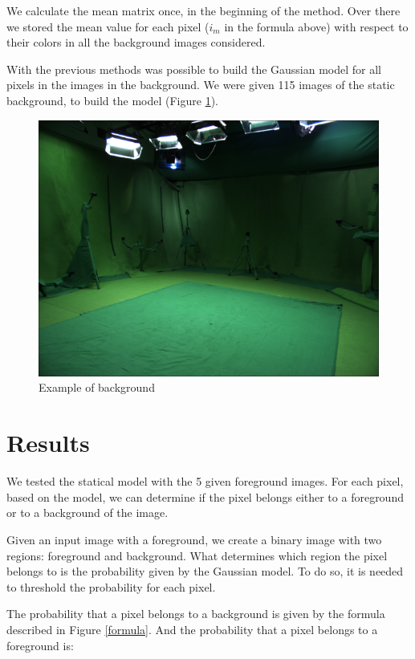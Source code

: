 \documentclass{article}
\begin{document}
We calculate the mean matrix once, in the beginning of the method. Over there we stored the mean value for each pixel (\textit{$i_m$} in the formula above) with respect to their colors in all the background images considered.

With the previous methods was possible to build the Gaussian model for all pixels in the images in the background. We were given 115 images of the static background, to build the model (Figure \ref{background}).

	\begin{figure} [H]
		\centering
		\includegraphics[scale=0.3]{img/img_000000}
		\caption{Example of background\label{background}}
	\end{figure}


\section{Results}
	We tested the statical model with the 5 given foreground images. For each pixel, based on the model, we can determine if the pixel belongs either to a foreground or to a background of the image.

	Given an input image with a foreground, we create a binary image with two regions: foreground and background. What determines which region the pixel belongs to is the probability given by the Gaussian model. To do so, it is needed to threshold the probability for each pixel.

	The probability that a pixel belongs to a background is given by the formula described in Figure \ref{formula}. And the probability that a pixel belongs to a foreground is:
\end{document}
